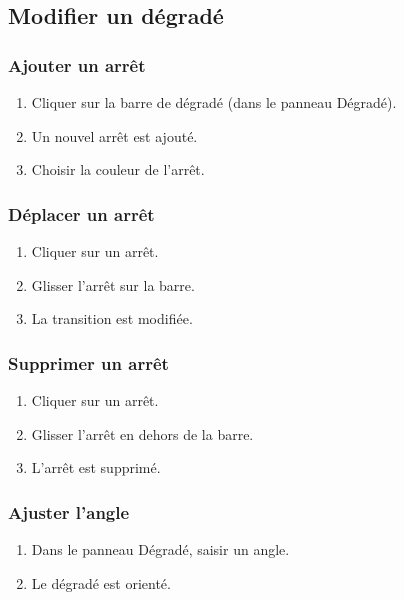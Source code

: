 \subsection{Modifier un dégradé}

\subsubsection{Ajouter un arrêt}

\begin{enumerate}
    \item Cliquer sur la barre de dégradé (dans le panneau Dégradé).
    \item Un nouvel arrêt est ajouté.
    \item Choisir la couleur de l'arrêt.
\end{enumerate}

\subsubsection{Déplacer un arrêt}

\begin{enumerate}
    \item Cliquer sur un arrêt.
    \item Glisser l'arrêt sur la barre.
    \item La transition est modifiée.
\end{enumerate}

\subsubsection{Supprimer un arrêt}

\begin{enumerate}
    \item Cliquer sur un arrêt.
    \item Glisser l'arrêt en dehors de la barre.
    \item L'arrêt est supprimé.
\end{enumerate}

\subsubsection{Ajuster l'angle}

\begin{enumerate}
    \item Dans le panneau Dégradé, saisir un angle.
    \item Le dégradé est orienté.
\end{enumerate}

